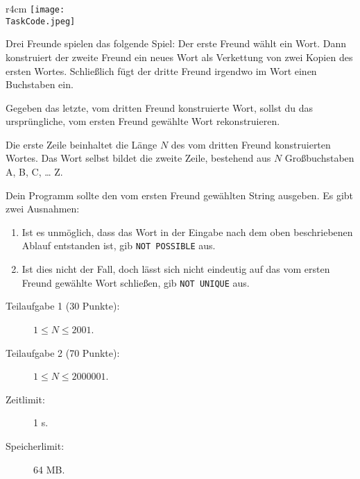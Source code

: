 \documentclass{boi2014-de}
\renewcommand{\TaskCode}{friends}
\begin{document}
    \begin{wrapfigure}{r}{4cm}
        \vspace{-24pt}
		\texttt{[image: \\TaskCode.jpeg]}
	\end{wrapfigure}
    Drei Freunde spielen das folgende Spiel:
    Der erste Freund wählt ein Wort.
    Dann konstruiert der zweite Freund ein neues Wort als Verkettung von zwei Kopien des ersten Wortes.
    Schließlich fügt der dritte Freund irgendwo im Wort einen Buchstaben ein.

    \Task
    Gegeben das letzte, vom dritten Freund konstruierte Wort, sollst du das ursprüngliche, vom ersten Freund gewählte Wort rekonstruieren.

    \Input
    Die erste Zeile beinhaltet die Länge $N$ des vom dritten Freund konstruierten Wortes.
    Das Wort selbst bildet die zweite Zeile, bestehend aus $N$ Großbuchstaben A, B, C, \ldots{} Z.

    \Output
    Dein Programm sollte den vom ersten Freund gewählten String ausgeben.
    Es gibt zwei Ausnahmen:
    \begin{enumerate}
        \item Ist es unmöglich, dass das Wort in der Eingabe nach dem oben beschriebenen Ablauf entstanden ist, gib {\tt NOT POSSIBLE} aus.
        \item Ist dies nicht der Fall, doch lässt sich nicht eindeutig auf das vom ersten Freund gewählte Wort schließen, gib {\tt NOT
        UNIQUE} aus.
    \end{enumerate}
    

    \Examples


    \Scoring

    \begin{description}
        \item[Teilaufgabe 1 (30 Punkte):] $1 \le N \le 2001$.
        \item[Teilaufgabe 2 (70 Punkte):] $1 \le N \le 2000001$.
    \end{description}

    \Constraints

    \begin{description}
        \item[Zeitlimit:] 1 s.
        \item[Speicherlimit:] 64 MB.
    \end{description}
\end{document}
